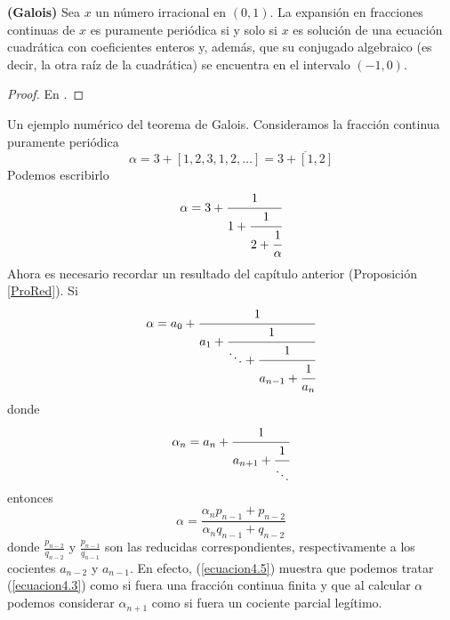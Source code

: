 \begin{teo}
\textbf{(Galois)} Sea $x$ un número irracional en $(0,1)$. La expansión en fracciones continuas de $x$ es puramente periódica si y solo si $x$ es solución de una ecuación cuadrática con coeficientes enteros y, además, que su conjugado algebraico (es decir, la otra raíz de la cuadrática) se encuentra en el intervalo $(-1, 0)$.
\label{Galois}
\end{teo}
\begin{proof}
En \cite{Olds}.
\end{proof}
\begin{ejem}
Un ejemplo numérico del teorema de Galois. Consideramos la fracción continua puramente periódica
    $$
    \alpha = 3+[1,2,3,1,2,\ldots]=\overline{3+[1,2]}
    $$
    Podemos escribirlo
    \begin{equation}
        \alpha=3+\cfrac{1}{1+\cfrac{1}{2+\cfrac{1}{\alpha}}}
        \label{ecuacion4.2}
    \end{equation}
    Ahora es necesario recordar un resultado del capítulo anterior (Proposición \ref{ProRed}). Si
    \begin{equation}
        \alpha = a_{0}+\cfrac{1}{a_{1}+\cfrac{1}{\ddots+\cfrac{1}{a_{n-1}+\cfrac{1}{a_{n}}}}}
        \label{ecuacion4.3}
    \end{equation}
    donde
    \begin{equation}
        \alpha_{n} = a_{n} + \cfrac{1}{a_{n+1}+\cfrac{1}{\ddots}}
        \label{ecuacion4.4}
    \end{equation}
    entonces
    \begin{equation}
        \alpha = \frac{\alpha_{n}p_{n-1}+p_{n-2}}{\alpha_{n}q_{n-1}+q_{n-2}}
        \label{ecuacion4.5}
    \end{equation}
    donde $\frac{p_{n-2}}{q_{n-2}}$ y $\frac{p_{n-1}}{q_{n-1}}$ son las reducidas correspondientes, respectivamente a los cocientes $a_{n-2}$ y $a_{n-1}.$ En efecto, (\ref{ecuacion4.5}) muestra que podemos tratar (\ref{ecuacion4.3}) como si fuera una fracción continua finita y que al calcular $\alpha$ podemos considerar $\alpha_{n + 1}$ como si fuera un cociente parcial legítimo.
    

\end{ejem}
